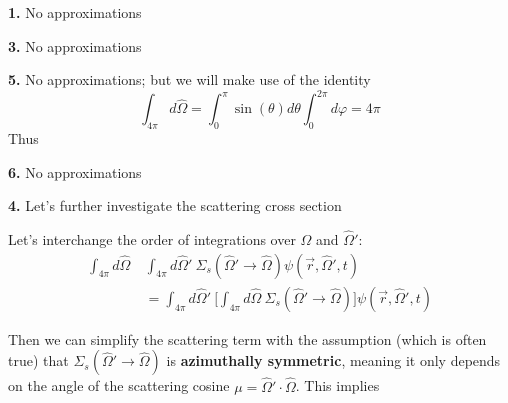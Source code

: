 \documentclass[12pt]{article}
\newif\ifeqns
\newcommand{\vOmega}{\ensuremath{\hat{\Omega}}}
\begin{document}
\textbf{1.} No approximations
\ifeqns
\begin{equation}
\frac{1}{v}\frac{\partial}{\partial t} \int_{4\pi} d\vOmega \: \psi(\vec{r}, \vOmega, t) = \boxed{\frac{1}{v}\frac{\partial}{\partial t}\phi(\vec{r}, t)}\nonumber
\end{equation}
\else
\vspace*{3em}
\fi

\textbf{3.} No approximations
\ifeqns
\begin{equation}
\Sigma_t \int_{4\pi} d\vOmega \:\psi(\vec{r}, \vOmega, t) = \boxed{\Sigma_t \phi(\vec{r}, t)} \nonumber 
\end{equation}
\else
\vspace*{3em}
\fi

\textbf{5.} No approximations; but we will make use of the identity
\[\int_{4\pi} d\vOmega = \int_0^{\pi} \sin(\theta) d\theta \int_0^{2\pi} d\varphi = 4\pi \]
Thus
\ifeqns
\begin{align*}
\int_{4\pi} d\vOmega\: \frac{\nu \Sigma_f}{4\pi} &\int_{4\pi} d\vOmega' \:\psi(\vec{r},\vOmega', t) = \\
& 4\pi \frac{\nu \Sigma_f}{4\pi} \int_{4\pi} d\vOmega'\: \psi(\vec{r},\vOmega', t) = \boxed{\nu \Sigma_f \phi(\vec{r}, t)}
\end{align*}
\else
\vspace*{5em}
\fi

\textbf{6.} No approximations
\ifeqns
\begin{equation}
\int_{4\pi} d\vOmega \:s(\vec{r}, \vOmega, t) \equiv \boxed{S(\vec{r}, t)} \nonumber
\end{equation}
\else
\vspace*{3em}
\fi

\textbf{4.} Let's further investigate the scattering cross section

Let's interchange the order of integrations over $\vOmega$ and $\vOmega'$:
%
\begin{align*}
\int_{4\pi} d\vOmega\: &\int_{4\pi} d\vOmega'\: \Sigma_s(\vOmega' \rightarrow \vOmega) \psi(\vec{r}, \vOmega', t)\\
%
&= \int_{4\pi} d\vOmega'\: \bigl[ \int_{4\pi} d\vOmega\: \Sigma_s(\vOmega' \rightarrow \vOmega)\bigr] \psi(\vec{r}, \vOmega', t)
\end{align*}

Then we can simplify the scattering term with the assumption (which is often true) that $\Sigma_s(\vOmega' \rightarrow \vOmega)$ is \textbf{azimuthally symmetric}, meaning it only depends on the angle of the scattering cosine $\mu =\vOmega' \cdot \vOmega$.  This implies
\ifeqns
\[\int_{4\pi} d\vOmega \:\Sigma_s(\vOmega' \cdot \vOmega) = 2\pi \int_{-1}^{1} d\mu\: \Sigma_s(\mu) = \Sigma_s\]
\else
\vspace*{3em}
\fi
\end{document}
